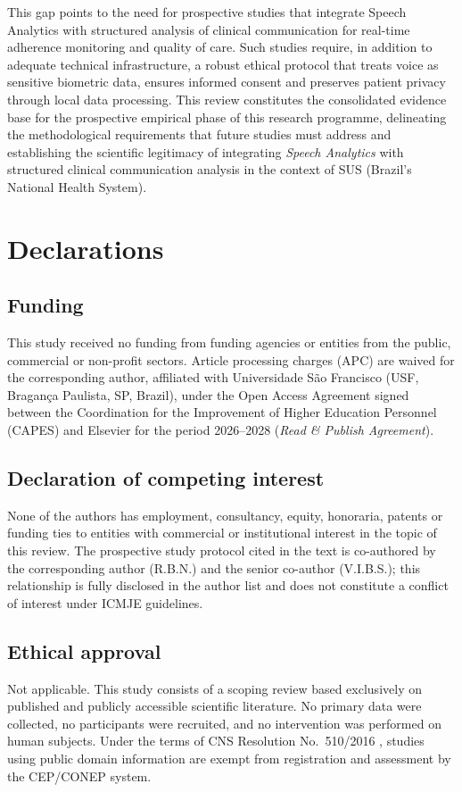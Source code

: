 \documentclass[review,12pt]{elsarticle}
\begin{document}
This gap points to the need for prospective studies that integrate Speech
Analytics with structured analysis of clinical communication for real-time
adherence monitoring and quality of care.
Such studies require, in addition to adequate technical infrastructure, a
robust ethical protocol that treats voice as sensitive biometric data, ensures
informed consent and preserves patient privacy through local data processing.
This review constitutes the consolidated evidence base for the prospective
empirical phase of this research programme, delineating the methodological
requirements that future studies must address and establishing the
scientific legitimacy of integrating \textit{Speech Analytics} with
structured clinical communication analysis in the context of SUS
(Brazil's National Health System).

\section*{Declarations}

\subsection*{Funding}
This study received no funding from funding agencies or entities from the
public, commercial or non-profit sectors.
Article processing charges (APC) are waived for the corresponding author,
affiliated with Universidade São Francisco (USF, Bragança Paulista, SP,
Brazil), under the Open Access Agreement signed between the Coordination for
the Improvement of Higher Education Personnel (CAPES) and Elsevier for the
period 2026--2028 (\textit{Read \& Publish Agreement}).

\subsection*{Declaration of competing interest}
None of the authors has employment, consultancy, equity, honoraria, patents
or funding ties to entities with commercial or institutional interest in the
topic of this review.
The prospective study protocol cited in the text \citep{BaenaNeto2026} is
co-authored by the corresponding author (R.B.N.) and the senior co-author
(V.I.B.S.); this relationship is fully disclosed in the author list and does
not constitute a conflict of interest under ICMJE guidelines.

\subsection*{Ethical approval}
Not applicable. This study consists of a scoping review based exclusively on
published and publicly accessible scientific literature. No primary data were
collected, no participants were recruited, and no intervention was performed
on human subjects.
Under the terms of CNS Resolution No.~510/2016 \citep{CNS510_2016}, studies
using public domain information are exempt from registration and assessment
by the CEP/CONEP system.
\end{document}
